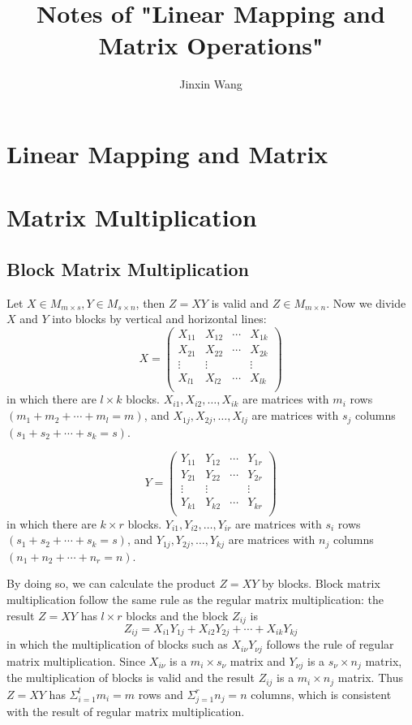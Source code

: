 \documentclass[onecolumn]{ctexart}
\title{Notes of "Linear Mapping and Matrix Operations"}
\author{Jinxin Wang}
\date{}
\begin{document}
\maketitle

\section{Linear Mapping and Matrix}

\section{Matrix Multiplication}

\subsection{Block Matrix Multiplication}

Let $X \in M_{m \times s}, Y \in M_{s \times n}$, then $Z = XY$ is valid and $Z 
\in M_{m \times n}$. Now we divide $X$ and $Y$ into blocks by vertical and 
horizontal lines:
\[
  X = 
  \begin{pmatrix}
    X_{11} & X_{12} & \cdots & X_{1k} \\
    X_{21} & X_{22} & \cdots & X_{2k} \\
    \vdots & \vdots &  & \vdots \\
    X_{l1} & X_{l2} & \cdots & X_{lk} \\
  \end{pmatrix}
\]
in which there are $l \times k$ blocks. $X_{i1}, X_{i2}, \ldots, X_{ik}$ are 
matrices with $m_i$ rows $(m_1 + m_2 + \cdots + m_l = m)$, and $X_{1j}, X_{2j}, 
\ldots, X_{lj}$ are matrices with $s_j$ columns $(s_1 + s_2 + \cdots + s_k = s)$.

\[
  Y = 
  \begin{pmatrix}
    Y_{11} & Y_{12} & \cdots & Y_{1r} \\
    Y_{21} & Y_{22} & \cdots & Y_{2r} \\
    \vdots & \vdots &  & \vdots \\
    Y_{k1} & Y_{k2} & \cdots & Y_{kr} \\
  \end{pmatrix} 
\]
in which there are $k \times r$ blocks. $Y_{i1}, Y_{i2}, \ldots, Y_{ir}$ are 
matrices with $s_i$ rows $(s_1 + s_2 + \cdots + s_k = s)$, and $Y_{1j}, Y_{2j}, 
\ldots, Y_{kj}$ are matrices with $n_j$ columns $(n_1 + n_2 + \cdots + n_r = n)$.

By doing so, we can calculate the product $Z = XY$ by blocks. Block matrix 
multiplication follow the same rule as the regular matrix multiplication: the 
result $Z = XY$ has $l \times r$ blocks and the block $Z_{ij}$ is
\[
  Z_{ij} = X_{i1}Y_{1j} + X_{i2}Y_{2j} + \cdots + X_{ik}Y_{kj}
\]
in which the multiplication of blocks such as $X_{i\nu}Y_{\nu j}$ follows the 
rule of regular matrix multiplication. Since $X_{i\nu}$ is a $m_i \times s_\nu$ 
matrix and $Y_{\nu j}$ is a $s_\nu \times n_j$ matrix, the multiplication of 
blocks is valid and the result $Z_{ij}$ is a $m_i \times n_j$ matrix. Thus $Z = 
XY$ has $\Sigma_{i=1}^l m_i = m$ rows and $\Sigma_{j=1}^r n_j = n$ columns, 
which is consistent with the result of regular matrix multiplication.
\end{document}

